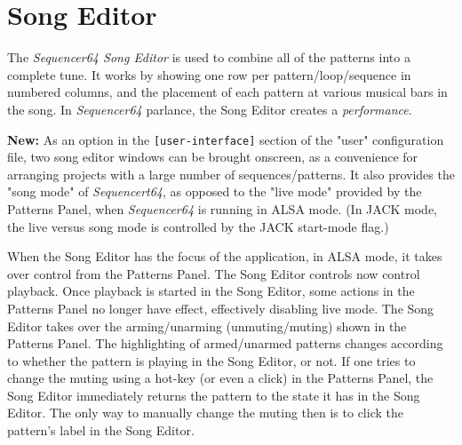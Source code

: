 %
%
%

\section{Song Editor}
\label{sec:seq64_song_editor}

   The \textsl{Sequencer64 Song Editor} is used to combine all of the patterns
   into a complete tune.  It works by showing one row per
   pattern/loop/sequence in numbered columns, and the placement of each
   pattern at various musical bars in the song.
   In \textsl{Sequencer64} parlance, the Song Editor creates a
   \textsl{performance}.

   \textbf{New:}
   As an option in the \texttt{[user-interface]}
   section of the "user" configuration file, two song editor windows can be
   brought onscreen, as a convenience for arranging projects with a large
   number of sequences/patterns.
   It also provides the "song mode" of \textsl{Sequencert64},
   as opposed to the "live mode" provided by the Patterns Panel, when
   \textsl{Sequencer64} is running in ALSA mode.
   (In JACK mode, the live versus song mode is controlled by the JACK start-mode
   flag.)

   When the Song Editor has the focus of the application, in ALSA mode, it
   takes over control from the Patterns Panel.  The Song Editor controls now
   control playback.  Once playback is started in the Song Editor, some actions
   in the Patterns Panel no longer have effect, effectively disabling live
   mode.  The Song Editor takes over the arming/unarming (unmuting/muting)
   shown in the Patterns Panel.  The highlighting of armed/unarmed patterns
   changes according to whether the pattern is playing in the Song Editor, or
   not.  If one tries to change the muting using a hot-key (or even a click) in
   the Patterns Panel, the Song Editor immediately returns the pattern to the
   state it has in the Song Editor.  The only way to manually change the muting
   then is to click the pattern's label in the Song Editor.
   
